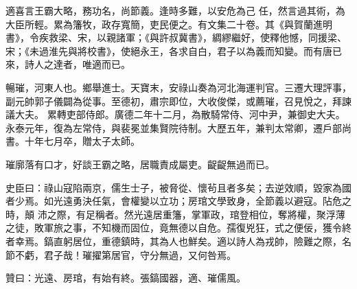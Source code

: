 \begin{pinyinscope}
 適喜言王霸大略，務功名，尚節義。逢時多難，以安危為己
 任，然言過其術，為大臣所輕。累為籓牧，政存寬簡，吏民便之。有文集二十卷。其《與賀蘭進明書》，令疾救梁、宋，以親諸軍；《與許叔冀書》，綢繆繼好，使釋他憾，同援梁、宋；《未過淮先與將校書》，使絕永王，各求自白，君子以為義而知變。而有唐已來，詩人之達者，唯適而已。



 暢璀，河東人也。鄉舉進士。天寶末，安祿山奏為河北海運判官。三遷大理評事，副元帥郭子儀闢為從事。至德初，肅宗即位，大收俊傑，或薦璀，召見悅之，拜諫議大夫。
 累轉吏部侍郎。廣德二年十二月，為散騎常侍、河中尹，兼御史大夫。永泰元年，復為左常侍，與裴冕並集賢院待制。大歷五年，兼判太常卿，遷戶部尚書。十年七月卒，贈太子太師。



 璀廓落有口才，好談王霸之略，居職責成屬吏。齪齪無過而已。



 史臣曰：祿山寇陷兩京，儒生士子，被脅從、懷茍且者多矣；去逆效順，毀家為國者少焉。如光遠勇決任氣，會權變以立功；房琯文學致身，全節義以避寇。阽危之時，顛
 沛之際，有足稱者。然光遠居重籓，掌軍政，琯登相位，奪將權，聚浮薄之徒，敗軍旅之事，不知機而固位，竟無德以自危。孺復兇狂，式之便佞，獲令終者幸焉。鎬直躬居位，重德鎮時，其為人也鮮矣。適以詩人為戎帥，險難之際，名節不虧，君子哉！璀擢第居官，守分無過，又何咎焉。



 贊曰：光遠、房琯，有始有終。張鎬國器，適、璀儒風。



\end{pinyinscope}